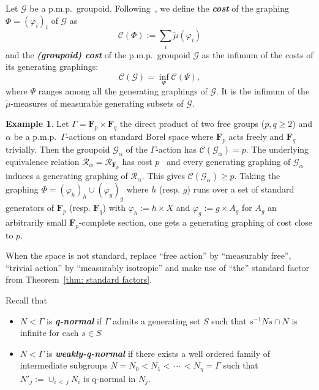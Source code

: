 \documentclass[10pt]{amsart}
\theoremstyle{definition}
\newtheorem{exam}[cdrthm]{Example}
\newcommand{\defin}[1]{\textbf{\emph{#1}}}
\newcommand{\FF}{\mathbf{F}}
\newcommand{\RR}{\mathcal{R}}
\newcommand{\cost}{\mathcal{C}}
\newcommand{\cg}{\mathcal{G}}
\newcommand{\ph}{\varphi}
\newcommand{\pmp}{p.m.p.\ }
\begin{document}
Let $\cg$ be a \pmp groupoid. Following~\cite{Lev95}, we define the
\defin{cost} of the graphing $\Phi=(\ph_i)_i$ of $\cg$ as
\begin{equation}
\cost(\Phi):=\sum_i \widetilde \mu(\ph_i)
\end{equation}
and the
\defin{(groupoid) cost} of the \pmp groupoid $\cg$ as the infimum of the costs of its generating graphings:
\begin{equation}
\cost(\cg)=\inf_\Psi\cost(\Psi),
\end{equation}
where $\Psi$ ranges among all the generating graphings of $\cg$. It is the infimum of the $\widetilde{\mu}$-measures of measurable generating subsets of $\cg$.


\begin{exam}
Let $\Gamma=\FF_p\times \FF_q$ the direct product of two free groups ($p, q\geq 2$) and $\alpha $ be a \pmp $\Gamma$-actions on standard Borel space where $\FF_p$ acts freely and $\FF_q$ trivially. Then the groupoid $\cg_{\alpha}$ of the $\Gamma$-action has $\cost(\cg_{\alpha})=p$. The underlying equivalence relation $\RR_{\alpha}=\RR_{\FF_p}$ has cost $p$~\cite{Gab-cost} and every generating graphing of $\cg_{\alpha}$ induces a generating graphing of $\RR_{\alpha}$. This gives $\cost(\cg_{\alpha})\geq p$. Taking the graphing $\Phi=(\ph_h)_{h}\cup (\ph_g)_g$ where $h$ (resp. $g$) runs over a set of standard generators of $\FF_p$ (resp. $\FF_q$) with $\ph_h:=h\times X$ and $\ph_g:=g\times A_g$ for $A_g$ an arbitrarily small $\FF_p$-complete section, one gets a generating graphing of cost close to $p$.

When the space is not standard, replace ``free action'' by ``measurably free'', ``trivial action'' by ``measurably isotropic'' and make use of ``the'' standard factor from Theorem~\ref{thm: standard factors}.
\end{exam}


Recall that
\begin{itemize}
\item[--] $N<\Gamma$ is \defin{q-normal} if $\Gamma$ admits a generating set $S$ such that $s ^{-1}N s\cap N$ is infinite for each $s\in S$
\item[--] $N<\Gamma$ is \defin{weakly-q-normal} if there exists a well ordered family of intermediate subgroups $N=N_0<N_1<\,\cdots\,<N_{\eta}=\Gamma$ such that $N'_j:=\cup_{i\,<\,j} N_i$ is q-normal in $N_j$.
\end{itemize}
\end{document}
